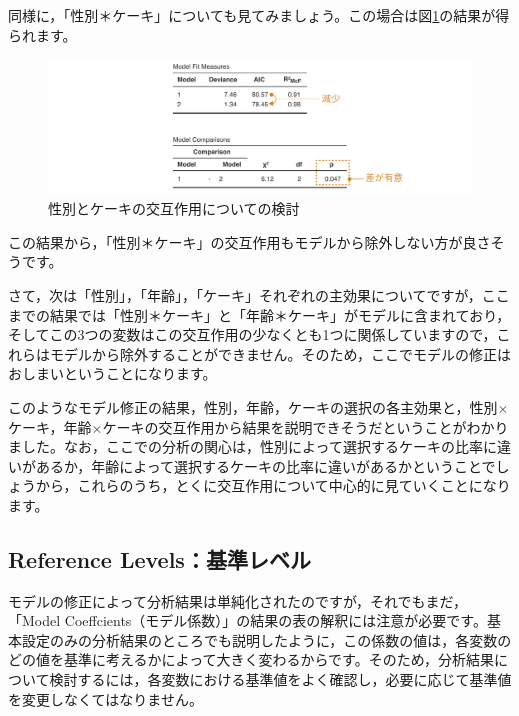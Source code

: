 \documentclass[
  12pt,
  a5jpaper,
  lualatex, ja=standard]{bxjsbook}
\begin{document}
同様に，「性別＊ケーキ」についても見てみましょう。この場合は図\ref{fig:frequencies-loglin-modelbuilder-comparison4}の結果が得られます。

\begin{figure}[!ht]

{\centering \includegraphics[width=1\linewidth]{images/frequencies/loglin-modelbuilder-comparison4} 

}

\caption{性別とケーキの交互作用についての検討}\label{fig:frequencies-loglin-modelbuilder-comparison4}
\end{figure}

この結果から，「性別＊ケーキ」の交互作用もモデルから除外しない方が良さそうです。

さて，次は「性別」，「年齢」，「ケーキ」それぞれの主効果についてですが，ここまでの結果では「性別＊ケーキ」と「年齢＊ケーキ」がモデルに含まれており，そしてこの3つの変数はこの交互作用の少なくとも1つに関係していますので，これらはモデルから除外することができません。そのため，ここでモデルの修正はおしまいということになります。

このようなモデル修正の結果，性別，年齢，ケーキの選択の各主効果と，性別×ケーキ，年齢×ケーキの交互作用から結果を説明できそうだということがわかりました。なお，ここでの分析の関心は，性別によって選択するケーキの比率に違いがあるか，年齢によって選択するケーキの比率に違いがあるかということでしょうから，これらのうち，とくに交互作用について中心的に見ていくことになります。

\hypertarget{sub:frequencies-loglin-referencelevels}{%
\subsection{Reference Levels：基準レベル}\label{sub:frequencies-loglin-referencelevels}}

モデルの修正によって分析結果は単純化されたのですが，それでもまだ，「Model Coeffcients（モデル係数）」の結果の表の解釈には注意が必要です。基本設定のみの分析結果のところでも説明したように，この係数の値は，各変数のどの値を基準に考えるかによって大きく変わるからです。そのため，分析結果について検討するには，各変数における基準値をよく確認し，必要に応じて基準値を変更しなくてはなりません。
\end{document}
